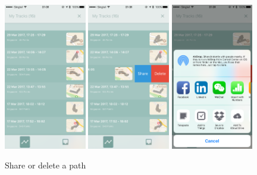 \documentclass[12pt,a4paper]{article}
\begin{document}
            \begin{figure}[H]
                \includegraphics[width=0.32\textwidth]{2-3-2-a}
                \includegraphics[width=0.32\textwidth]{2-3-2-b}
                \includegraphics[width=0.32\textwidth]{2-3-2-c}
                \centering
                \caption{Share or delete a path}
                \label{fig:share-delete-path}
            \end{figure}
            
\end{document}
